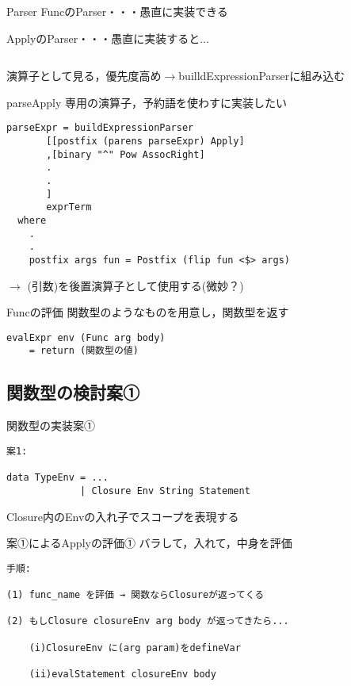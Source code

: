 \documentclass[uplatex,dvipdfmx,ja=standard]{beamer}
\begin{document}
\begin{frame}[fragile]{Parser}
FuncのParser・・・愚直に実装できる

ApplyのParser・・・愚直に実装すると...
    \begin{verbatim}

    \end{verbatim}
演算子として見る，優先度高め$\to$builldExpressionParserに組み込む
\end{frame}

\begin{frame}[fragile]{parseApply}
専用の演算子，予約語を使わすに実装したい
    \begin{verbatim}
parseExpr = buildExpressionParser
       [[postfix (parens parseExpr) Apply]
       ,[binary "^" Pow AssocRight]
       .
       .
       ]
       exprTerm 
  where
    .
    .
    postfix args fun = Postfix (flip fun <$> args)
    \end{verbatim}

$\to$ (引数)を後置演算子として使用する(微妙？)

\end{frame}

\begin{frame}[fragile]{Funcの評価}
    関数型のようなものを用意し，関数型を返す
    \begin{verbatim}
evalExpr env (Func arg body) 
    = return (関数型の値)
    \end{verbatim}
\end{frame}

\subsection{関数型の検討案①}

\begin{frame}[fragile]{関数型の実装案①}
    \begin{verbatim}
案1:

data TypeEnv = ... 
             | Closure Env String Statement
    \end{verbatim}
Closure内のEnvの入れ子でスコープを表現する
\end{frame}

\begin{frame}[fragile]{案①によるApplyの評価①}
バラして，入れて，中身を評価
    \begin{verbatim}
手順:

(1) func_name を評価 → 関数ならClosureが返ってくる

(2) もしClosure closureEnv arg body が返ってきたら...

    (i)ClosureEnv に(arg param)をdefineVar

    (ii)evalStatement closureEnv body
    \end{verbatim}
\end{frame}
\end{document}
